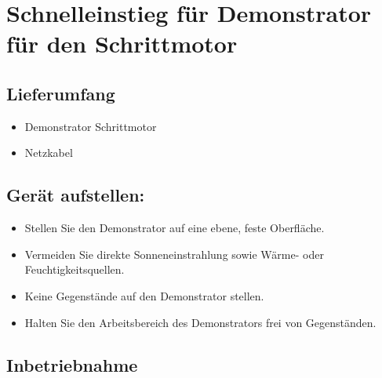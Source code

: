 \documentclass[12pt,a4paper]{scrbook}
\begin{document}
	
	\chapter{Schnelleinstieg für Demonstrator für den Schrittmotor}
	
	\section{Lieferumfang}
	
	\begin{itemize}
		\item Demonstrator Schrittmotor
		\item Netzkabel
	\end{itemize}
	
	\section{Gerät aufstellen:}
	\begin{itemize}
		\item Stellen Sie den Demonstrator auf eine ebene, feste Oberfläche.
		\item Vermeiden Sie direkte Sonneneinstrahlung sowie Wärme- oder Feuchtigkeitsquellen.
		\item Keine Gegenstände auf den Demonstrator stellen.
		\item Halten Sie den Arbeitsbereich des Demonstrators frei von Gegenständen.
	\end{itemize}
	
	\section{Inbetriebnahme}
	
\end{document}
